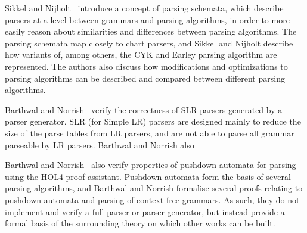 	Sikkel and Nijholt~\cite{sikkel97} introduce a concept of parsing schemata,
	which describe parsers at a level between grammars and parsing algorithms,
	in order to more easily reason about similarities and differences between
	parsing algorithms. The parsing schemata map closely to chart parsers, and
	Sikkel and Nijholt describe how variants of, among others, the CYK and
	Earley parsing algorithm are represented. The authors also discuss how
	modifications and optimizations to parsing algorithms can be described and
	compared between different parsing algorithms.

	Barthwal and Norrish~\cite{barthwal09} verify the correctness of SLR
	parsers generated by a parser generator. SLR (for Simple LR) parsers are
	designed mainly to reduce the size of the parse tables from LR parsers, and
	are not able to parse all grammar parseable by LR parsers. Barthwal and
	Norrish also

	Barthwal and Norrish~\cite{barthwal13} also verify properties of pushdown
	automata for parsing using the HOL4 proof assistant. Pushdown automata form
	the basis of several parsing algorithms, and Barthwal and Norrish formalise
	several proofs relating to pushdown automata and parsing of context-free
	grammars. As such, they do not implement and verify a full parser or parser
	generator, but instead provide a formal basis of the surrounding theory on
	which other works can be built.
